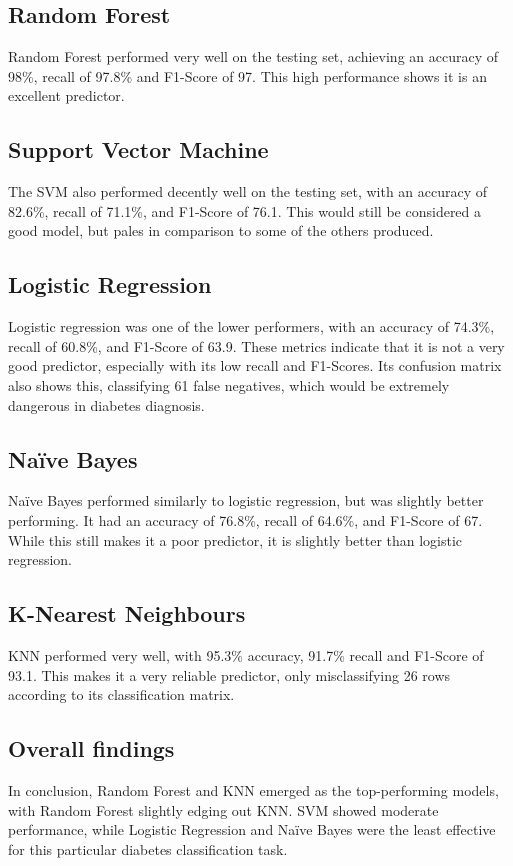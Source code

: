 \documentclass[12pt]{report}
\begin{document}
\subsection{Random Forest}
Random Forest performed very well on the testing set, achieving an accuracy of 98\%, recall of 97.8\% and F1-Score of 97.
This high performance shows it is an excellent predictor.

\subsection{Support Vector Machine}
The SVM also performed decently well on the testing set, with an accuracy of 82.6\%, recall of 71.1\%, and F1-Score of 76.1.
This would still be considered a good model, but pales in comparison to some of the others produced.

\subsection{Logistic Regression}
Logistic regression was one of the lower performers, with an accuracy of 74.3\%, recall of 60.8\%, and F1-Score of 63.9.
These metrics indicate that it is not a very good predictor, especially with its low recall and F1-Scores. Its confusion matrix 
also shows this, classifying 61 false negatives, which would be extremely dangerous in diabetes diagnosis.

\subsection{Na\"ive Bayes}
Na\"ive Bayes performed similarly to logistic regression, but was slightly better performing. It had an accuracy of 76.8\%, recall of 
64.6\%, and F1-Score of 67. While this still makes it a poor predictor, it is slightly better than logistic regression.

\subsection{K-Nearest Neighbours}
KNN performed very well, with 95.3\% accuracy, 91.7\% recall and F1-Score of 93.1. This makes it a very reliable predictor, only 
misclassifying 26 rows according to its classification matrix. 

\subsection{Overall findings}
In conclusion, Random Forest and KNN emerged as the top-performing models, with Random Forest slightly edging out KNN.
SVM showed moderate performance, while Logistic Regression and Naïve Bayes were the least effective for this particular diabetes classification
task.
\end{document}
